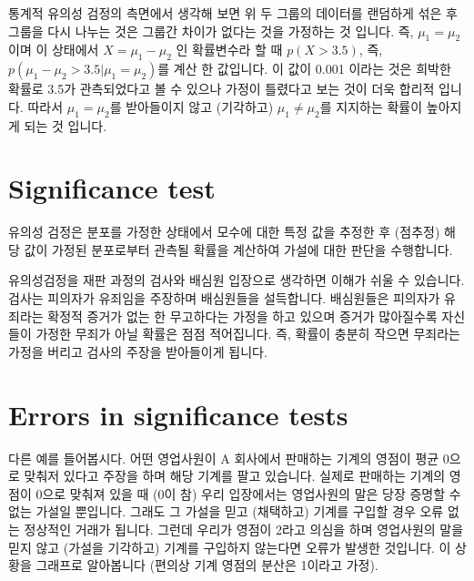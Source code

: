 \documentclass[
]{book}
\begin{document}
통계적 유의성 검정의 측면에서 생각해 보면 위 두 그룹의 데이터를 랜덤하게 섞은 후 그룹을 다시 나누는 것은 그룹간 차이가 없다는 것을 가정하는 것 입니다. 즉, \(\mu_1 = \mu_2\) 이며 이 상태에서 \(X=\mu_1 - \mu_2\) 인 확률변수라 할 때 \(p(X > 3.5)\), 즉, \(p(\mu_1 - \mu_2 > 3.5 | \mu_1 = \mu_2)\)를 계산 한 값입니다. 이 값이 0.001 이라는 것은 희박한 확률로 3.5가 관측되었다고 볼 수 있으나 가정이 틀렸다고 보는 것이 더욱 합리적 입니다. 따라서 \(\mu_1 = \mu_2\)를 받아들이지 않고 (기각하고) \(\mu_1 \ne \mu_2\)를 지지하는 확률이 높아지게 되는 것 입니다.

\hypertarget{significance-test}{%
\section{Significance test}\label{significance-test}}

유의성 검정은 분포를 가정한 상태에서 모수에 대한 특정 값을 추정한 후 (점추정) 해당 값이 가정된 분포로부터 관측될 확률을 계산하여 가설에 대한 판단을 수행합니다.

유의성검정을 재판 과정의 검사와 배심원 입장으로 생각하면 이해가 쉬울 수 있습니다. 검사는 피의자가 유죄임을 주장하며 배심원들을 설득합니다. 배심원들은 피의자가 유죄라는 확정적 증거가 없는 한 무고하다는 가정을 하고 있으며 증거가 많아질수록 자신들이 가정한 무죄가 아닐 확률은 점점 적어집니다. 즉, 확률이 충분히 작으면 무죄라는 가정을 버리고 검사의 주장을 받아들이게 됩니다.

\hypertarget{errors-in-significance-tests}{%
\section{Errors in significance tests}\label{errors-in-significance-tests}}

다른 예를 들어봅시다. 어떤 영업사원이 A 회사에서 판매하는 기계의 영점이 평균 0으로 맞춰저 있다고 주장을 하며 해당 기계를 팔고 있습니다. 실제로 판매하는 기계의 영점이 0으로 맞춰져 있을 때 (0이 참) 우리 입장에서는 영업사원의 말은 당장 증명할 수 없는 가설일 뿐입니다. 그래도 그 가설을 믿고 (채택하고) 기계를 구입할 경우 오류 없는 정상적인 거래가 됩니다. 그런데 우리가 영점이 2라고 의심을 하며 영업사원의 말을 믿지 않고 (가설을 기각하고) 기계를 구입하지 않는다면 오류가 발생한 것입니다. 이 상황을 그래프로 알아봅니다 (편의상 기계 영점의 분산은 1이라고 가정).
\end{document}

